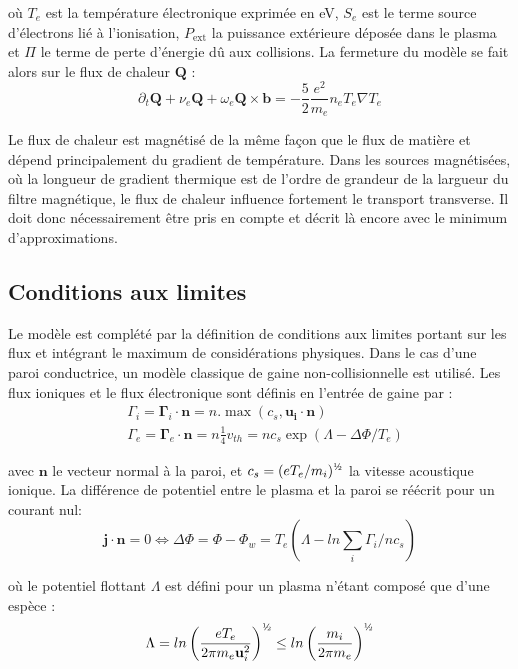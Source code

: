 où $T_e$ est la température électronique exprimée en eV, $S_e$ est le
terme source d'électrons lié à l'ionisation, $P_\text{ext}$ la puissance
extérieure déposée dans le plasma et $\Pi$ le terme de perte d'énergie dû aux collisions. La fermeture du modèle se fait alors sur le flux de chaleur
$\mathbf{Q}$ \cite{Golant} :
\begin{equation}
\partial_t \mathbf{Q} + \nu_e\mathbf{Q}+\omega_e\mathbf{Q}\times\mathbf{b} =
-\frac{5}{2}\frac{e^2}{m_e}n_eT_e\nabla T_e
\end{equation}

Le flux de chaleur est magnétisé de la même façon que le flux de matière et
dépend principalement du gradient de température. Dans les sources magnétisées,
où la longueur de gradient thermique est de l'ordre de grandeur de la largueur
du filtre magnétique, le flux de chaleur influence fortement le transport
transverse. Il doit donc nécessairement être pris en compte et décrit là encore
avec le minimum d'approximations.

\subsection{Conditions aux limites}
Le modèle est complété par la définition de conditions aux limites
portant sur les flux et intégrant le maximum de considérations physiques. Dans
le cas d'une paroi conductrice, un modèle classique de gaine non-collisionnelle
est utilisé. Les flux ioniques et le flux électronique sont définis en
l'entrée de gaine par :
\begin{align}
&\Gamma_i=\boldsymbol{\Gamma}_i\cdot\mathbf{n}=n.\max\left(c_s,\mathbf{u_i}\cdot\mathbf{n}\right)
\\
&\Gamma_e=\boldsymbol{\Gamma}_e\cdot\mathbf{n}=n\frac{1}{4}v_{th}=nc_s\exp(\Lambda-\Delta
\Phi/T_e)
\end{align}

avec $\mathbf{n}$ le vecteur normal à la paroi,
et $c_s=(eT_e/m_i)^{\text{\textonehalf}}$ la vitesse acoustique ionique.
La différence de potentiel entre le plasma et la
paroi se réécrit pour un courant nul:
\begin{equation}
	\mathbf{j}\cdot\mathbf{n}=0\Leftrightarrow \Delta \Phi=\Phi-\Phi_w =
T_e(\Lambda-ln\sum_i\Gamma_i/nc_s)
\end{equation} 

où le potentiel flottant $\Lambda$ est défini pour un plasma
n'étant composé que d'une espèce :
\begin{equation}
	\Lambda=ln\left(\frac{eT_e}{2\pi
	m_e\mathbf{u}_i^2}\right)^{\text{\textonehalf}} \le 
	ln\left(\frac{m_i}{2\pi m_e}\right)^{\text{\textonehalf}}
\end{equation}

